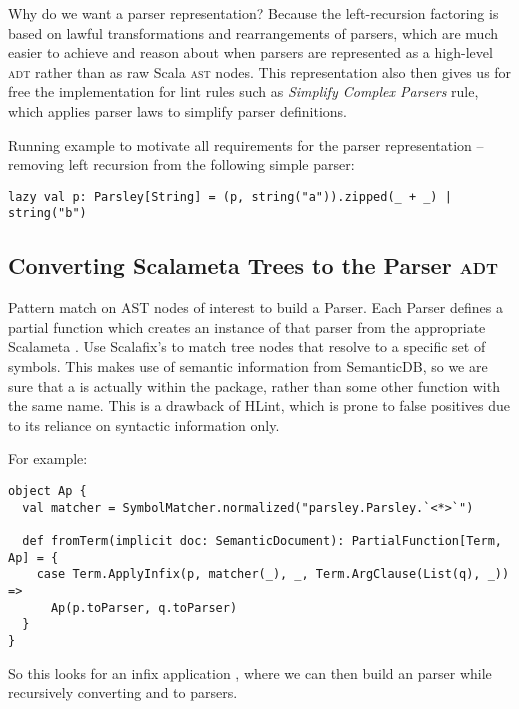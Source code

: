 \documentclass[../../main.tex]{subfiles}
\begin{document}
Why do we want a parser representation? Because the left-recursion factoring is based on lawful transformations and rearrangements of parsers,
which are much easier to achieve and reason about when parsers are represented as a high-level \textsc{adt} rather than as raw Scala \textsc{ast} nodes.
This representation also then gives us for free the implementation for lint rules such as \emph{Simplify Complex Parsers} rule, which applies parser laws to simplify parser definitions.

Running example to motivate all requirements for the parser representation -- removing left recursion from the following simple parser:
\begin{verbatim}
lazy val p: Parsley[String] = (p, string("a")).zipped(_ + _) | string("b")
\end{verbatim}

\subsection{Converting Scalameta Trees to the Parser \textsc{adt}}
Pattern match on AST nodes of interest to build a Parser.
Each Parser defines a partial function  which creates an instance of that parser from the appropriate Scalameta .
Use Scalafix's  to match tree nodes that resolve to a specific set of symbols.
This makes use of semantic information from SemanticDB, so we are sure that a \scala{<*>} is actually within the  package, rather than some other function with the same name.
This is a drawback of HLint, which is prone to false positives due to its reliance on syntactic information only.

For example:
\begin{verbatim}
object Ap {
  val matcher = SymbolMatcher.normalized("parsley.Parsley.`<*>`")

  def fromTerm(implicit doc: SemanticDocument): PartialFunction[Term, Ap] = {
    case Term.ApplyInfix(p, matcher(_), _, Term.ArgClause(List(q), _)) =>
      Ap(p.toParser, q.toParser)
  }
}
\end{verbatim}
So this looks for an infix application , where we can then build an  parser while recursively converting  and  to parsers.
\end{document}
